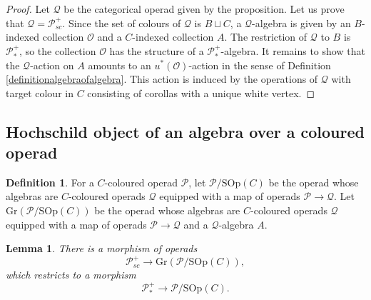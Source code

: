 \documentclass[]{amsart}
\newtheorem{lemma}[theorem]{Lemma}
\theoremstyle{definition}
\newtheorem{definition}[theorem]{Definition}
\begin{document}
\begin{proof}
	Let $\mathcal{Q}$ be the categorical operad given by the proposition. Let us prove that $\mathcal{Q} = \mathcal{P}_{sc}^+$. Since the set of colours of $\mathcal{Q}$ is $B \sqcup C$, a $\mathcal{Q}$-algebra is given by an $B$-indexed collection $\mathcal{O}$ and a $C$-indexed collection $A$. The restriction of $\mathcal{Q}$ to $B$ is $\mathcal{P}_*^+$, so the collection $\mathcal{O}$ has the structure of a $\mathcal{P}_*^+$-algebra. It remains to show that the $\mathcal{Q}$-action on $A$ amounts to an $u^*(\mathcal{O})$-action in the sense of Definition \ref{definitionalgebraofalgebra}. This action is induced by the operations of $\mathcal{Q}$ with target colour in $C$ consisting of corollas with a unique white vertex.
\end{proof}






\subsection{Hochschild object of an algebra over a coloured operad}

\begin{definition}
	For a $C$-coloured operad $\mathcal{P}$, let $\mathcal{P} / \mathrm{SOp}(C)$ be the operad whose algebras are $C$-coloured operads $\mathcal{Q}$ equipped with a map of operads $\mathcal{P} \to \mathcal{Q}$. Let $\mathrm{Gr}(\mathcal{P} / \mathrm{SOp}(C))$ be the operad whose algebras are $C$-coloured operads $\mathcal{Q}$ equipped with a map of operads $\mathcal{P} \to \mathcal{Q}$ and a $\mathcal{Q}$-algebra $A$.
\end{definition}

\begin{lemma}\label{lemmamapofoperads}
	There is a morphism of operads
	\begin{equation}\label{equationfirstmorphism}
		\mathcal{P}_{sc}^+ \to \mathrm{Gr}(\mathcal{P} / \mathrm{SOp}(C)),
	\end{equation}
	which restricts to a morphism
	\begin{equation}\label{equationsecondmorphism}
		\mathcal{P}_*^+ \to \mathcal{P} / \mathrm{SOp}(C).
	\end{equation}
\end{lemma}
\end{document}
